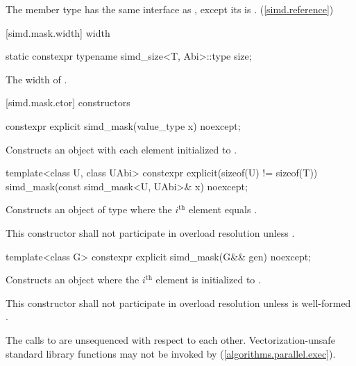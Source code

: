 \pnum
The member type  has the same interface as , except its  is . (\ref{simd.reference})

[simd.mask.width]{ width}

\begin{itemdecl}
static constexpr typename simd_size<T, Abi>::type size;
\end{itemdecl}

\begin{itemdescr}
  \pnum\returns
  The width of .
\end{itemdescr}

[simd.mask.ctor]{\texorpdfstring{ constructors}{simd_mask constructors}}

\begin{itemdecl}
constexpr explicit simd_mask(value_type x) noexcept;
\end{itemdecl}

\begin{itemdescr}
  \pnum\effects
  Constructs an object with each element initialized to .
\end{itemdescr}

\begin{itemdecl}
template<class U, class UAbi>
  constexpr explicit(sizeof(U) != sizeof(T)) simd_mask(const simd_mask<U, UAbi>& x) noexcept;
\end{itemdecl}

\begin{itemdescr}
  \pnum\effects
  Constructs an object of type  where the $i^\text{th}$ element equals  \foralli.

  \pnum\remarks
  This constructor shall not participate in overload resolution unless .
\end{itemdescr}

\begin{itemdecl}
template<class G> constexpr explicit simd_mask(G&& gen) noexcept;
\end{itemdecl}

\begin{itemdescr}
  \pnum\effects
  Constructs an object where the $i^\text{th}$ element is initialized to .

  \pnum\remarks
  This constructor shall not participate in overload resolution unless  is well-formed \foralli.

  \pnum
  The calls to  are unsequenced with respect to each other.
  Vectorization-unsafe standard library functions may not be invoked by  (\ref{algorithms.parallel.exec}).
\end{itemdescr}

